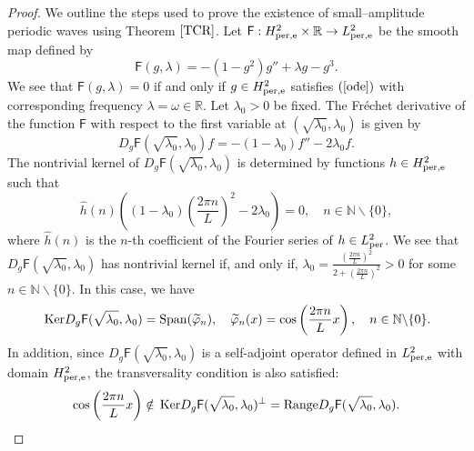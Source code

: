 \documentclass[12pt,reqno]{amsart}
\newcommand{\R}{{\mathbb R}}
\newcommand{\Ker}{{\rm \,Ker}}
\numberwithin{equation}{section}
\numberwithin{figure}{section}
\begin{document}
	\begin{proof}
		We outline the steps used to prove the existence of small--amplitude periodic waves using Theorem $\ref{TCR}$. Let $\mathsf{F}:H_{\rm per,e}^2\times\mathbb{R}\rightarrow L_{\rm per,e}^2$ be the smooth map defined by
		$$
			\mathsf{F}(g,\lambda)=-(1-g^2)g''+\lambda g-g^3.
		$$
			We see that $\mathsf{F}(g,\lambda)=0$ if and only if $g\in H_{\rm per,e}^2$ satisfies $(\ref{ode})$ with corresponding frequency $\lambda = \omega \in \R$. Let $\lambda_0>0$ be fixed. The Fr\'echet derivative of the function $\mathsf{F}$ with respect to the first variable at $(\sqrt{\lambda_0},\lambda_0)$ is given by
		$$
			D_{g}\mathsf{F}(\sqrt{\lambda_0},\lambda_0)f=-(1-\lambda_0)f''-2\lambda_0f.
	$$
The nontrivial kernel of $	D_{g}\mathsf{F}(\sqrt{\lambda_0},\lambda_0)$ is determined by functions $h\in H_{\rm per,e}^2$ such that 
$$
\widehat{h}(n)\left((1-\lambda_0)\left(\frac{2\pi n}{L}\right)^2-2\lambda_0\right)=0, \quad n\in\mathbb{N}\backslash\{0\},
$$
where $\widehat{h}(n)$ is the $n$-th coefficient of the Fourier series of $h\in L_{\rm per}^2$. We see that 	$D_{g}\mathsf{F}(\sqrt{\lambda_0},\lambda_0)$ has nontrivial kernel if, and only if, $\lambda_0=\frac{\left(\frac{2\pi n}{L}\right)^2}{2+\left(\frac{2\pi n}{L}\right)^2}>0$ for some $n\in\mathbb{N}\backslash\{0\}$. In this case, we have 
$$	
\Ker D_{g}\mathsf{F}(\sqrt{\lambda_0},\lambda_0) = {\rm Span}(\widetilde{\varphi}_n), \quad \widetilde{\varphi}_n(x)=\cos\left(\frac{2\pi n}{L}x\right), \quad n\in\mathbb{N}\backslash\{0\}.
$$
In addition, since $D_{g}\mathsf{F}(\sqrt{\lambda_0},\lambda_0)$ is a self-adjoint operator defined in $L_{\rm per,e}^2$ with domain $H_{\rm per,e}^2$, the transversality condition is also satisfied:
$$
\cos\left(\frac{2\pi n}{L}x\right) \notin \Ker D_{g}\mathsf{F}(\sqrt{\lambda_0},\lambda_0)^{\bot} = {\rm Range}D_{g}\mathsf{F}(\sqrt{\lambda_0},\lambda_0).
$$ 


\end{proof}
\end{document}
